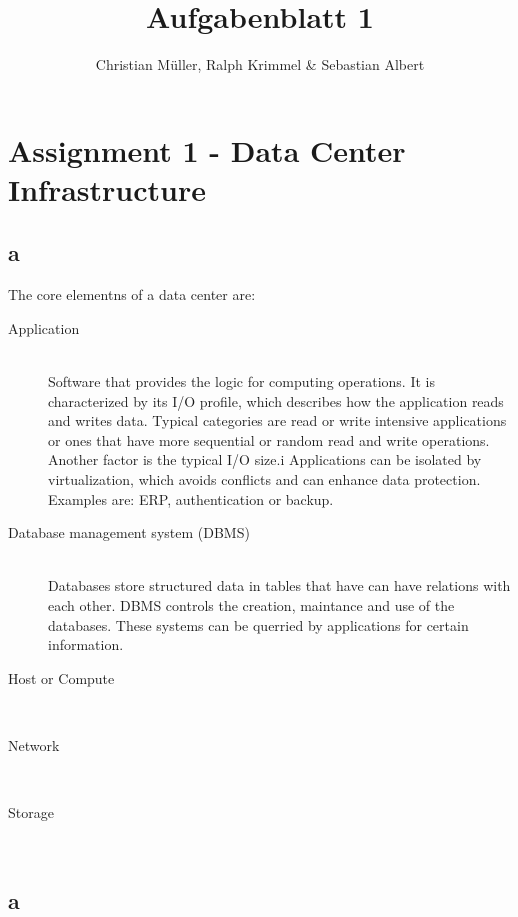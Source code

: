 \documentclass{article}
\begin{document}
\title{Aufgabenblatt 1}
\author{Christian Müller, Ralph Krimmel \& Sebastian Albert }

\maketitle


\section{Assignment 1 - Data Center Infrastructure}

\subsection{a}
	The core elementns of a data center are:\\
	\begin{description}
		\item[Application] \hfill \\
			Software that provides the logic for computing operations.
			It is characterized by its I/O profile,
			which describes how the application reads and writes data.
			Typical categories are read or write intensive applications
			or ones that have more sequential or random read and write operations.
			Another factor is the typical I/O size.i
			Applications can be isolated by virtualization,
			which avoids conflicts and can enhance data protection.\\
			Examples are: ERP, authentication or backup.

		\item[Database management system (DBMS)] \hfill \\
			Databases store structured data in tables that have can have relations with each other.
			DBMS controls the creation, maintance and use of the databases.
			These systems can be querried by applications for certain information.
			
		\item[Host or Compute] \hfill \\
		\item[Network] \hfill \\
		\item[Storage] \hfill \\
	\end{description}




\subsection{a}
\end{document}
